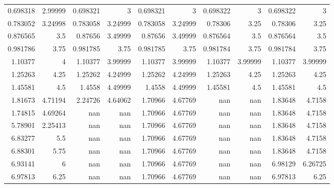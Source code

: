 \documentclass[10pt,letterpaper]{article}
\begin{document}
\begin{figure}
\begin{tabular}{rrrrrrrrrr}
 0.698318  &  2.99999  &    0.698321  &     3        &        0.698321  &         3        &   0.698322  &   3       &    0.698322  &      3       \\
 0.783052  &  3.24998  &    0.783058  &     3.24999  &        0.783058  &         3.24999  &   0.78306   &   3.25    &    0.78306   &      3.25    \\
 0.876565  &  3.5      &    0.87656   &     3.49999  &        0.87656   &         3.49999  &   0.876564  &   3.5     &    0.876564  &      3.5     \\
 0.981786  &  3.75     &    0.981785  &     3.75     &        0.981785  &         3.75     &   0.981784  &   3.75    &    0.981784  &      3.75    \\
 1.10377   &  4        &    1.10377   &     3.99999  &        1.10377   &         3.99999  &   1.10377   &   3.99999 &    1.10377   &      3.99999 \\
 1.25263   &  4.25     &    1.25262   &     4.24999  &        1.25262   &         4.24999  &   1.25263   &   4.25    &    1.25263   &      4.25    \\
 1.45581   &  4.5      &    1.4558    &     4.49999  &        1.4558    &         4.49999  &   1.45581   &   4.5     &    1.45581   &      4.5     \\
 1.81673   &  4.71194  &    2.24726   &     4.64062  &        1.70966   &         4.67769  & nan         & nan       &    1.83648   &      4.7158  \\
 1.74815   &  4.69264  &  nan         &   nan        &        1.70966   &         4.67769  & nan         & nan       &    1.83648   &      4.7158  \\
 5.78901   &  2.25413  &  nan         &   nan        &        1.70966   &         4.67769  & nan         & nan       &    1.83648   &      4.7158  \\
 6.83277   &  5.5      &  nan         &   nan        &        1.70966   &         4.67769  & nan         & nan       &    1.83648   &      4.7158  \\
 6.88301   &  5.75     &  nan         &   nan        &        1.70966   &         4.67769  & nan         & nan       &    1.83648   &      4.7158  \\
 6.93141   &  6        &  nan         &   nan        &        1.70966   &         4.67769  & nan         & nan       &    6.98129   &      6.26725 \\
 6.97813   &  6.25     &  nan         &   nan        &        1.70966   &         4.67769  & nan         & nan       &    6.97813   &      6.25    \\

\end{tabular}
\end{figure}
\end{document}
